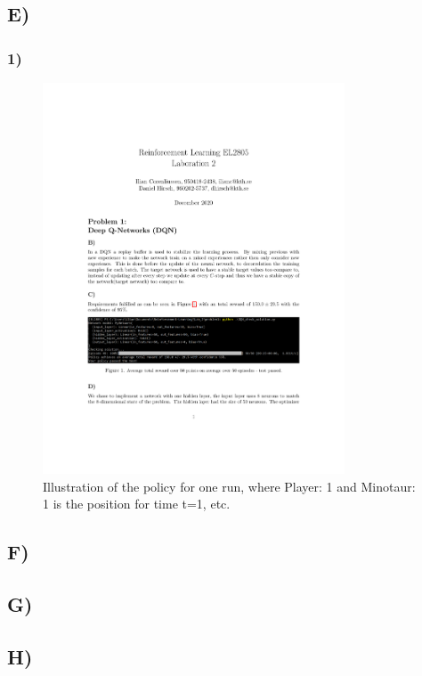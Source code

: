 \documentclass{article}
\begin{document}
\subsection*{E)}
\subsubsection{1)}
\begin{figure}[H]
    \centering
    \includegraphics[width=0.8\textwidth]{Lab_2/}
    \caption{\small Illustration of the policy for one run, where Player: 1 and Minotaur: 1 is the position for time t=1, etc. }
    \label{fig:Policy}
\end{figure}
\subsection*{F)}

\subsection*{G)}

\subsection*{H)}
\end{document}
